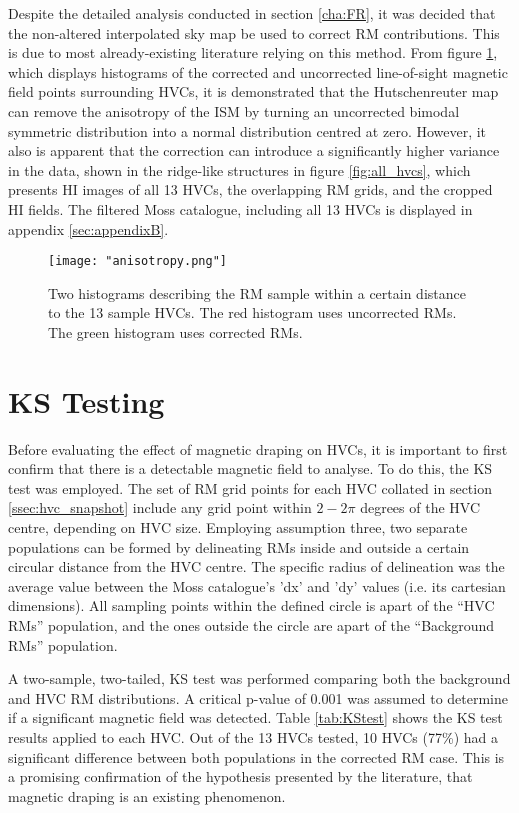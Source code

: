Despite the detailed analysis conducted in section \ref{cha:FR}, it was decided that the non-altered interpolated sky map be used to correct RM contributions. This is due to most already-existing literature relying on this method. From figure \ref{fig:anisotropy}, which displays histograms of the corrected and uncorrected line-of-sight magnetic field points surrounding HVCs, it is demonstrated that the Hutschenreuter map can remove the anisotropy of the ISM by turning an uncorrected bimodal symmetric distribution into a normal distribution centred at zero. However, it also is apparent that the correction can introduce a significantly higher variance in the data, shown in the ridge-like structures in figure \ref{fig:all_hvcs}, which presents HI images of all 13 HVCs, the overlapping RM grids, and the cropped HI fields. The filtered Moss catalogue, including all 13 HVCs is displayed in appendix \ref{sec:appendixB}.

\begin{figure}
    \texttt{[image: "anisotropy.png"]}
    \centering
    \caption{Two histograms describing the RM sample within a certain distance to the 13 sample HVCs. The red histogram uses uncorrected RMs. The green histogram uses corrected RMs.}
    \label{fig:anisotropy}
\end{figure}


\section{KS Testing}
\label{sec:KStest}

Before evaluating the effect of magnetic draping on HVCs, it is important to first confirm that there is a detectable magnetic field to analyse. To do this, the KS test was employed. The set of RM grid points for each HVC collated in section \ref{ssec:hvc_snapshot} include any grid point within $2 - 2\pi$ degrees of the HVC centre, depending on HVC size. Employing assumption three, two separate populations can be formed by delineating RMs inside and outside a certain circular distance from the HVC centre. The specific radius of delineation was the average value between the Moss catalogue's 'dx' and 'dy' values (i.e. its cartesian dimensions). All sampling points within the defined circle is apart of the “HVC RMs” population, and the ones outside the circle are apart of the “Background RMs” population.


A two-sample, two-tailed, KS test was performed comparing both the background and HVC RM distributions. A critical p-value of 0.001 was assumed to determine if a significant magnetic field was detected. Table \ref{tab:KStest} shows the KS test results applied to each HVC. Out of the 13 HVCs tested, 10 HVCs (77\%) had a significant difference between both populations in the corrected RM case. This is a promising confirmation of the hypothesis presented by the literature, that magnetic draping is an existing phenomenon.


